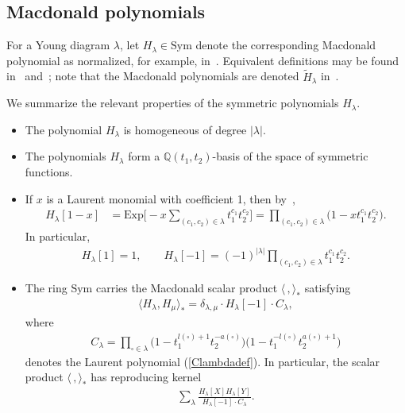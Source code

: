 \documentclass[10pt,a4paper]{amsart}
\numberwithin{equation}{section}
\newcommand{\Sym}{\mathrm{Sym}}
\newcommand{\Exp}{\mathrm{Exp}}
\def\Q{\mathbb Q}
\begin{document}
\subsection{Macdonald polynomials}

For a Young diagram $\lambda$, let $H_{\lambda}\in \Sym$ denote the corresponding Macdonald polynomial as normalized, for example, in~\cite[equation~(11)]{GH}.
Equivalent definitions may be found in~\cite[Theorem~2.2]{GH} and~\cite[Definition 4.1]{M}; note that the Macdonald polynomials are denoted $\tilde{H}_{\lambda}$ in~\cite{GH,GHT}.

We summarize the relevant properties of the symmetric polynomials $H_{\lambda}$.
\begin{itemize}\itemsep=0pt
\item The polynomial $H_{\lambda}$ is homogeneous of degree $|\lambda|$.
\item The polynomials $H_{\lambda}$ form a $\Q(t_1,t_2)$-basis of the space of symmetric functions.
\item If $x$ is a Laurent monomial with coefficient 1, then by~\cite[Corollary~2.1]{GH}, \begin{align}\label{specialvalues2}
 H_{\lambda}[1-x]&=\Exp\biggl[{-}x \sum_{(c_1,c_2)\in \lambda} t_1^{c_1}t_2^{c_2}\biggr]= \prod_{(c_1,c_2)\in \lambda} \big(1-xt_1^{c_1}t_2^{c_2}\big).
 \end{align}
In particular,
\begin{gather} \label{specialvalues1}
H_{\lambda}[1]=1,\qquad
H_{\lambda}[-1]=(-1)^{|\lambda|}\prod_{(c_1,c_2)\in \lambda} t_1^{c_1}t_2^{c_2}.
\end{gather}

\item The ring $\Sym$ carries the Macdonald scalar product $\langle\,,\rangle_{*}$ satisfying
\begin{align*}\nonumber
\langle H_{\lambda}, H_{\mu}\rangle_* = \delta_{\lambda,\mu}\cdot H_{\lambda}[-1]\cdot C_{\lambda},
\end{align*}
where
\begin{gather*}
C_{\lambda}= \prod_{\square\in\lambda}{\big(1- t_1^{l(\square)+1}t_2^{-a(\square)}\big)\big(1-t_1^{-l(\square)}t_2^{a(\square)+1}\big)}
\end{gather*}
denotes the Laurent polynomial (\ref{Clambdadef}).
In particular, the scalar product $\langle\,,\rangle_{*}$ has reproducing kernel \begin{gather}
\label{cauchy}
\sum_{\lambda}\frac{H_{\lambda}[X] H_{\lambda}[Y]} {H_{\lambda}[-1] \cdot C_{\lambda}} .
\end{gather}
\end{itemize}
\end{document}
